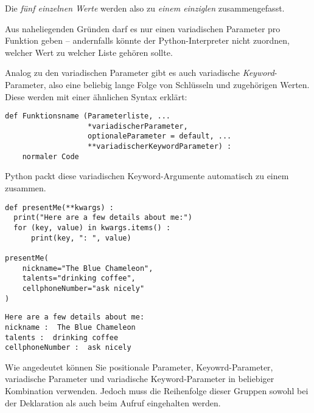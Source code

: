 Die \emph{fünf einzelnen Werte } werden also zu \emph{einem einziglen } zusammengefasst.

Aus naheliegenden Gründen darf es nur einen variadischen Parameter pro Funktion geben -- andernfalls könnte der Python-Interpreter nicht zuordnen, welcher Wert zu welcher Liste gehören sollte.

Analog zu den variadischen Parameter gibt es auch variadische \emph{Keyword}-Parameter, also eine beliebig lange Folge von Schlüsseln und zugehörigen Werten. Diese werden mit einer ähnlichen Syntax erklärt:

\begin{codebox}
\begin{verbatim}
def Funktionsname (Parameterliste, ...
                   *variadischerParameter, 
                   optionaleParameter = default, ...
                   **variadischerKeywordParameter) :
    normaler Code
\end{verbatim}
\end{codebox}

Python packt diese variadischen Keyword-Argumente automatisch zu einem  zusammen.

\begin{codebox}
\begin{verbatim}
def presentMe(**kwargs) :
  print("Here are a few details about me:")
  for (key, value) in kwargs.items() :
      print(key, ": ", value)

presentMe(
    nickname="The Blue Chameleon",
    talents="drinking coffee",
    cellphoneNumber="ask nicely"
)
\end{verbatim}
\end{codebox}
\begin{cmdbox}
\begin{verbatim}
Here are a few details about me:
nickname :  The Blue Chameleon
talents :  drinking coffee
cellphoneNumber :  ask nicely
\end{verbatim}
\end{cmdbox}

Wie angedeutet können Sie positionale Parameter, Keyowrd-Parameter, variadische Parameter und variadische Keyword-Parameter in beliebiger Kombination verwenden. Jedoch muss die Reihenfolge dieser Gruppen sowohl bei der Deklaration als auch beim Aufruf eingehalten werden.

